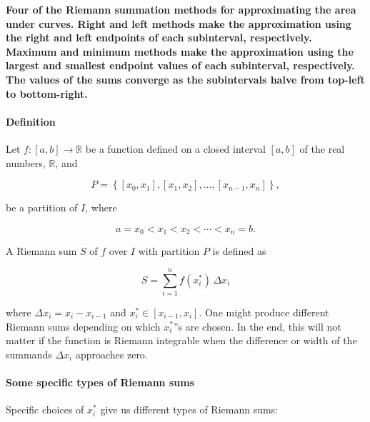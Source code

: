 \textbf{Four of the Riemann summation methods for approximating the area under curves. Right and left methods make the approximation using the right and left endpoints of each subinterval, respectively. Maximum and minimum methods make the approximation using the largest and smallest endpoint values of each subinterval, respectively. The values of the sums converge as the subintervals halve from top-left to bottom-right.}





\paragraph{Definition}



Let $f: [a,b] \rightarrow \mathbb{R}$ be a function defined on a closed interval $[a,b]$ of the real numbers, $\mathbb{R}$, and



$$P = \left\{[x_0,x_1],[x_1,x_2],\dots,[x_{n-1},x_n]\right\},$$



be a partition of $I$, where



$$a = x_0 < x_1 < x_2 < \cdots < x_n = b.$$



A Riemann sum $S$ of $f$ over $I$ with partition $P$ is defined as



$$S = \sum_{i=1}^{n} f(x_i^*)\, \Delta x_i$$



where $\Delta x_i = x_i - x_{i-1}$ and $x_i^* \in [x_{i-1}, x_i]$. One might produce different Riemann sums depending on which $x_i^*$''s are chosen. In the end, this will not matter if the function is Riemann integrable when the difference or width of the summands $\Delta x_i$ approaches zero.



\paragraph{Some specific types of Riemann sums}



Specific choices of $x_i^*$ give us different types of Riemann sums:



